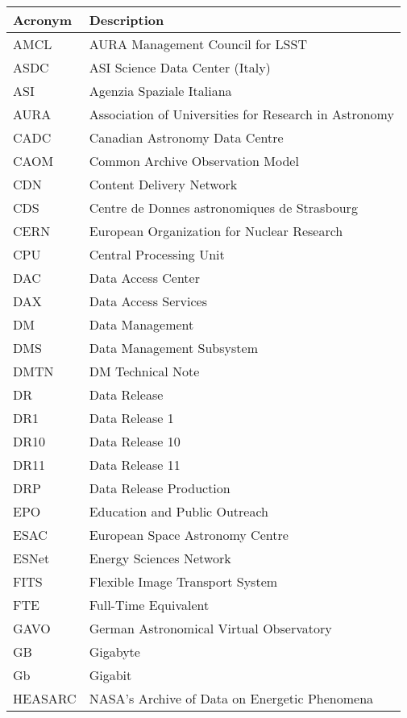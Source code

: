 \addtocounter{table}{-1}
\begin{longtable}{p{}p{}}\hline
\textbf{Acronym} & \textbf{Description}  \\\hline

AMCL & AURA Management Council for LSST \\\hline
ASDC & ASI Science Data Center (Italy) \\\hline
ASI & Agenzia Spaziale Italiana \\\hline
AURA & Association of Universities for Research in Astronomy \\\hline
CADC & Canadian Astronomy Data Centre \\\hline
CAOM & Common Archive Observation Model \\\hline
CDN & Content Delivery Network \\\hline
CDS & Centre de Donnes astronomiques de Strasbourg \\\hline
CERN & European Organization for Nuclear Research \\\hline
CPU & Central Processing Unit \\\hline
DAC & Data Access Center \\\hline
DAX & Data Access Services \\\hline
DM & Data Management \\\hline
DMS & Data Management Subsystem \\\hline
DMTN & DM Technical Note \\\hline
DR & Data Release \\\hline
DR1 & Data Release 1 \\\hline
DR10 & Data Release 10 \\\hline
DR11 & Data Release 11 \\\hline
DRP & Data Release Production \\\hline
EPO & Education and Public Outreach \\\hline
ESAC & European Space Astronomy Centre \\\hline
ESNet & Energy Sciences Network \\\hline
FITS & Flexible Image Transport System \\\hline
FTE & Full-Time Equivalent \\\hline
GAVO & German Astronomical Virtual Observatory \\\hline
GB & Gigabyte \\\hline
Gb & Gigabit \\\hline
HEASARC & NASA's Archive of Data on Energetic Phenomena \\\hline

\end{longtable}
